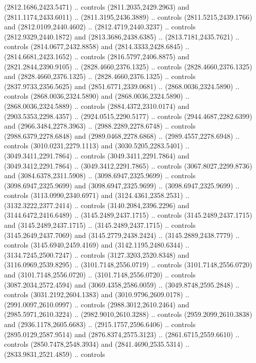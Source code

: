 \begin{scope}[shift={(407.03862,-246.29561)}]
\begin{scope}[shift={(-2346.9339,-1948.928)}]
      (2812.1686,2423.5471) .. controls (2811.2035,2429.2963) and
      (2811.1174,2433.6011) .. (2811.3195,2436.3889) .. controls
      (2811.5215,2439.1766) and (2812.0109,2440.4602) .. (2812.4719,2440.3237) ..
      controls (2812.9329,2440.1872) and (2813.3686,2438.6385) ..
      (2813.7181,2435.7621) .. controls (2814.0677,2432.8858) and
      (2814.3333,2428.6845) .. (2814.6681,2423.1652) .. controls
      (2816.5797,2406.8875) and (2821.2844,2390.9105) .. (2828.4660,2376.1325) ..
      controls (2828.4660,2376.1325) and (2828.4660,2376.1325) ..
      (2828.4660,2376.1325) .. controls (2837.9733,2356.5625) and
      (2851.6771,2339.0681) .. (2868.0036,2324.5890) .. controls
      (2868.0036,2324.5890) and (2868.0036,2324.5890) .. (2868.0036,2324.5889) ..
      controls (2884.4372,2310.0174) and (2903.5353,2298.4357) ..
      (2924.0515,2290.5177) .. controls (2944.4687,2282.6399) and
      (2966.3484,2278.3963) .. (2988.2289,2278.6748) .. controls
      (2988.6379,2278.6848) and (2989.0468,2278.6868) .. (2989.4557,2278.6948) ..
      controls (3010.0231,2279.1113) and (3030.5205,2283.5401) ..
      (3049.3411,2291.7864) .. controls (3049.3411,2291.7864) and
      (3049.3412,2291.7864) .. (3049.3412,2291.7865) .. controls
      (3067.8027,2299.8736) and (3084.6378,2311.5908) .. (3098.6947,2325.9699) ..
      controls (3098.6947,2325.9699) and (3098.6947,2325.9699) ..
      (3098.6947,2325.9699) .. controls (3113.0990,2340.6971) and
      (3124.4361,2358.2531) .. (3132.3222,2377.2414) .. controls
      (3140.2084,2396.2296) and (3144.6472,2416.6489) .. (3145.2489,2437.1715) ..
      controls (3145.2489,2437.1715) and (3145.2489,2437.1715) ..
      (3145.2489,2437.1715) .. controls (3145.2649,2437.7069) and
      (3145.2779,2438.2424) .. (3145.2889,2438.7779) .. controls
      (3145.6940,2459.4169) and (3142.1195,2480.6344) .. (3134.7245,2500.7247) ..
      controls (3127.3203,2520.8348) and (3116.0969,2539.8295) ..
      (3101.7148,2556.0719) .. controls (3101.7148,2556.0720) and
      (3101.7148,2556.0720) .. (3101.7148,2556.0720) .. controls
      (3087.2034,2572.4594) and (3069.4358,2586.0059) .. (3049.8748,2595.2848) ..
      controls (3031.2192,2604.1383) and (3010.9796,2609.0178) ..
      (2991.0097,2610.0997) .. controls (2988.3012,2610.2464) and
      (2985.5971,2610.3224) .. (2982.9010,2610.3288) .. controls
      (2959.2099,2610.3838) and (2936.1178,2605.6683) .. (2915.1757,2596.6406) ..
      controls (2895.0129,2587.9514) and (2876.8374,2575.3123) ..
      (2861.6715,2559.6610) .. controls (2850.7478,2548.3934) and
      (2841.4690,2535.5314) .. (2833.9831,2521.4859) .. controls

\end{scope}
\end{scope}
